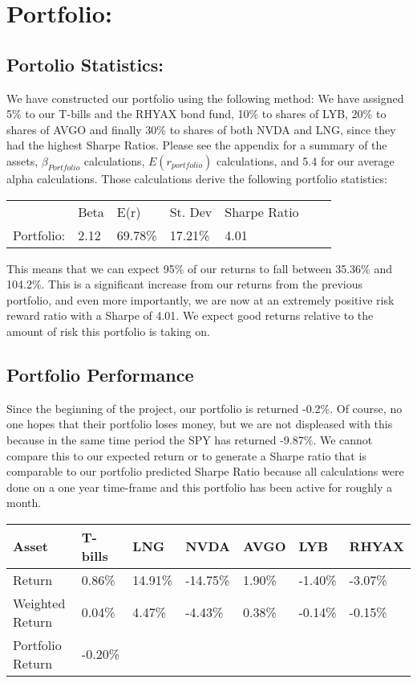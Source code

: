 \documentclass{article}
\begin{document}
\section{Portfolio:}

\subsection{Portolio Statistics:}
We have constructed our portfolio using the following method: We have assigned 5\% to our T-bills and the RHYAX bond fund, 10\% to shares of LYB, 20\% to shares of AVGO and finally 30\% to shares of both NVDA and LNG, since they had the highest Sharpe Ratios. Please see the appendix for a summary of the assets, $\beta_{Portfolio}$ calculations, $E(r_{portfolio})$ calculations, and 5.4 for our average alpha calculations. Those calculations derive the following portfolio statistics:

\begin{table}[H]
\centering
\begin{tabular}{lllllll}
           & Beta & E(r)    & St. Dev & Sharpe Ratio  \\
Portfolio: & 2.12 & 69.78\% & 17.21\% & 4.01         
\end{tabular}
\end{table}

\noindent

This means that we can expect 95\% of our returns to fall between 35.36\% and 104.2\%. This is a significant increase from our returns from the previous portfolio, and even more importantly, we are now at an extremely positive risk reward ratio with a Sharpe of 4.01. We expect good returns relative to the amount of risk this portfolio is taking on. 

\subsection{Portfolio Performance}

Since the beginning of the project, our portfolio is returned -0.2\%. Of course, no one hopes that their portfolio loses money, but we are not displeased with this because in the same time period the SPY has returned -9.87\%. We cannot compare this to our expected return or to generate a Sharpe ratio that is comparable to our portfolio predicted Sharpe Ratio because all calculations were done on a one year time-frame and this portfolio has been active for roughly a month.

\begin{table}[!ht]
    \centering
    \begin{tabular}{|l|l|l|l|l|l|l|}
    \hline
        Asset & T-bills & LNG & NVDA & AVGO & LYB & RHYAX \\ \hline
        Return & 0.86\% & 14.91\% & -14.75\% & 1.90\% & -1.40\% & -3.07\% \\ \hline
        Weighted Return & 0.04\% & 4.47\% & -4.43\% & 0.38\% & -0.14\% & -0.15\% \\ \hline
        Portfolio Return & -0.20\% & ~ & ~ & ~ & ~ & ~ \\ \hline
    \end{tabular}
\end{table}
\end{document}
